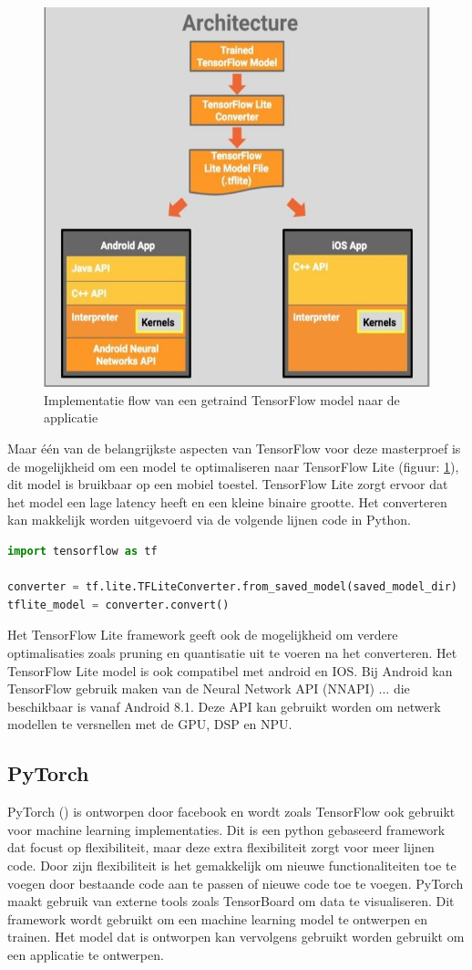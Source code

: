 \begin{figure}[!ht]
    \centering
 	\includegraphics[width=0.5\linewidth]{fig/TFLite.jpg}
 	\caption{Implementatie flow van een getraind TensorFlow model naar de applicatie}
 	\label{fig:tflite}
\end{figure}

Maar \'e\'en van de belangrijkste aspecten van TensorFlow voor deze masterproef is de mogelijkheid om een model te optimaliseren naar TensorFlow Lite (figuur: \ref{fig:tflite}), dit model is bruikbaar op een mobiel toestel.
TensorFlow Lite zorgt ervoor dat het model een lage latency heeft en een kleine binaire grootte.
Het converteren kan makkelijk worden uitgevoerd via de volgende lijnen code in Python.

\begin{lstlisting}[language=Python, caption=Converteren van TensorFlow naar een TensorFlow Lite model]
import tensorflow as tf

converter = tf.lite.TFLiteConverter.from_saved_model(saved_model_dir)
tflite_model = converter.convert()
\end{lstlisting}	

Het TensorFlow Lite framework geeft ook de mogelijkheid om verdere optimalisaties zoals pruning en quantisatie uit te voeren na het converteren.
Het TensorFlow Lite model is ook compatibel met android en IOS.
Bij Android kan TensorFlow gebruik maken van de Neural Network API (NNAPI) ... die beschikbaar is vanaf Android 8.1.
Deze API kan gebruikt worden om netwerk modellen te versnellen met de GPU, DSP en NPU.

\subsection{PyTorch}
PyTorch (\cite{li_PyTorch_2020}) is ontworpen door facebook en wordt zoals TensorFlow ook gebruikt voor machine learning implementaties.
Dit is een python gebaseerd framework dat focust op flexibiliteit, maar deze extra flexibiliteit zorgt voor meer lijnen code.
Door zijn flexibiliteit is het gemakkelijk om nieuwe functionaliteiten toe te voegen door bestaande code aan te passen of nieuwe code toe te voegen.
PyTorch maakt gebruik van externe tools zoals TensorBoard om data te visualiseren.
Dit framework wordt gebruikt om een machine learning model te ontwerpen en trainen.
Het model dat is ontworpen kan vervolgens gebruikt worden gebruikt om een applicatie te ontwerpen.

